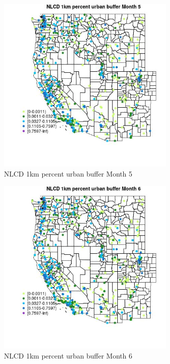 \begin{figure} 
\centering  
\includegraphics[width=0.77\textwidth]{Code_Outputs/Report_ML_input_PM25_Step4_part_e_de_duplicated_aves_compiled_2019-05-14wNAs_MapObsMo5NLCD_1km_percent_urban_buffer.jpg} 
\caption{\label{fig:Report_ML_input_PM25_Step4_part_e_de_duplicated_aves_compiled_2019-05-14wNAsMapObsMo5NLCD_1km_percent_urban_buffer}NLCD 1km percent urban buffer Month 5} 
\end{figure} 
 

\begin{figure} 
\centering  
\includegraphics[width=0.77\textwidth]{Code_Outputs/Report_ML_input_PM25_Step4_part_e_de_duplicated_aves_compiled_2019-05-14wNAs_MapObsMo6NLCD_1km_percent_urban_buffer.jpg} 
\caption{\label{fig:Report_ML_input_PM25_Step4_part_e_de_duplicated_aves_compiled_2019-05-14wNAsMapObsMo6NLCD_1km_percent_urban_buffer}NLCD 1km percent urban buffer Month 6} 
\end{figure} 
 

